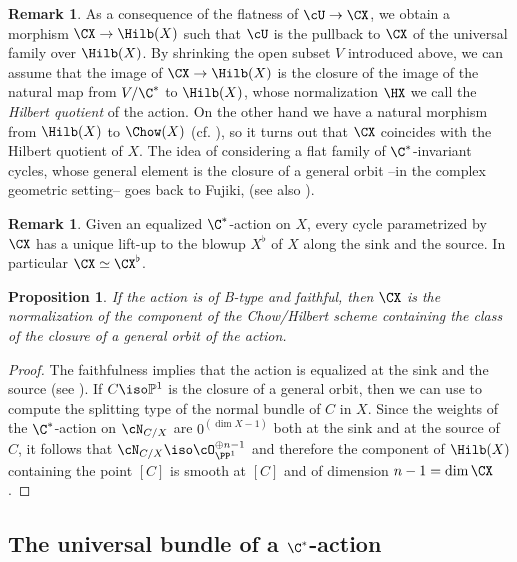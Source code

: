 \documentclass[reqno]{amsproc}
\newtheorem{proposition}[theorem]{Proposition}
\theoremstyle{definition}
\newtheorem{remark}[theorem]{Remark}
\begin{document}
\begin{remark}\label{wors6:rem:Hilb}
As a consequence of the flatness of $\cU\to \CX$, we obtain a morphism $\CX\to \Hilb(X)$ such that $\cU$ is the pullback to $\CX$ of the universal family over $\Hilb(X)$. By shrinking the open subset $V$ introduced above, we can assume that the image of $\CX\to \Hilb(X)$ is the closure of the image of the natural map from $V/\C^*$ to $\Hilb(X)$, whose normalization $\HX$ we call the {\em Hilbert quotient} of the action. On the other hand we have a natural morphism from $\Hilb(X)$ to $\Chow(X)$ (cf. \cite[Theorem I.6.3]{wors6-kollar}), so it turns out that $\CX$ coincides with the Hilbert quotient of $X$. The idea of considering a flat family of $\C^*$-invariant cycles, whose general element is the closure of a general orbit --in the complex geometric setting-- goes back to Fujiki, \cite{wors6-Fj} (see also \cite[Theorem~0.1.2]{wors6-BBSo}).
\end{remark}

\begin{remark}\label{wors6:rem:chblow}
Given an equalized $\C^*$-action on $X$, every cycle parametrized by $\CX$ has a unique lift-up to the blowup $X^\flat$  of $X$ along the sink and the source. In particular  $\CX \simeq \CX^\flat$.
\end{remark}

\begin{proposition}\label{wors6:prop:comp}
If the action is of B-type and faithful, then  $\CX$ is the normalization of the component of the Chow/Hilbert scheme containing the class of the closure of a general orbit of the action.
\end{proposition}
\begin{proof}
The faithfulness implies that the action is equalized at the sink and the source (see \cite[Remark 3.2]{wors6-WORS1}).
If $C\iso\mathbb{P}^1$ is the closure of a general orbit, then we can use \cite[Lemma 2.16]{wors6-WORS1} to compute the splitting type of the normal bundle of $C$ in $X$. Since the weights of the $\C^*$-action on $\cN_{C/X}$ are $0^{(\dim X-1)}$ both at the sink and at the source of $C$,
it follows that $\cN_{C/X}\iso\cO_{\PP^1}^{\oplus n-1}$ and therefore the component of $\Hilb(X)$ containing the point $[C]$ is smooth at $[C]$ and of dimension $n-1 = \dim \CX$.
\end{proof}


\subsection{The universal bundle of a $\C^*$-action}\label{wors6:ssec:bundle}
\end{document}
